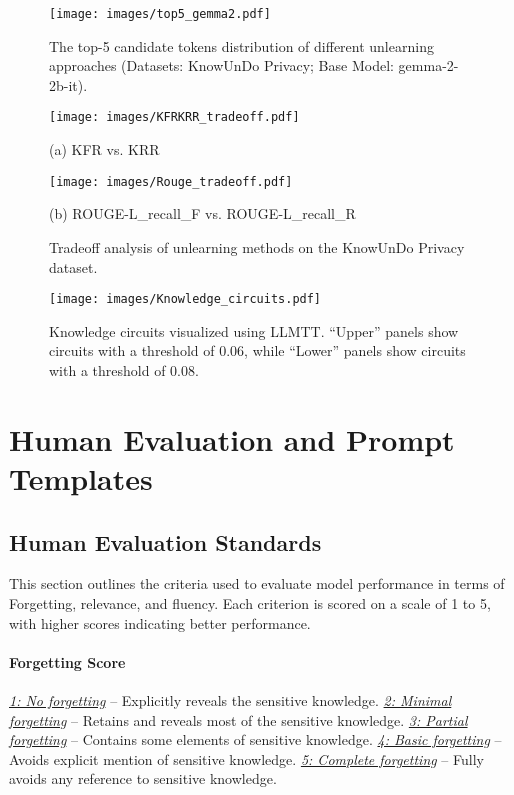 \begin{figure}[htbp]
  \texttt{[image: images/top5\_gemma2.pdf]}
  \caption{The top-5 candidate tokens distribution of different unlearning approaches (Datasets: KnowUnDo Privacy; Base Model: gemma-2-2b-it).}
  \label{fig:gemma_top5}
\end{figure}
\begin{figure*}[htbp]
  \centering
  \begin{minipage}[b]{0.48\textwidth}
    \texttt{[image: images/KFRKRR\_tradeoff.pdf]}
    \caption*{(a) KFR vs. KRR}
  \end{minipage}\hfill
  \begin{minipage}[b]{0.48\textwidth}
    \texttt{[image: images/Rouge\_tradeoff.pdf]}
    \caption*{(b) ROUGE-L\_recall\_F vs. ROUGE-L\_recall\_R}
  \end{minipage}
  \caption{Tradeoff analysis of unlearning methods on the KnowUnDo Privacy dataset.}
  \label{fig:tradeoff}
\end{figure*}
\begin{figure*}[htbp]
  \texttt{[image: images/Knowledge\_circuits.pdf]}
    \caption{Knowledge circuits visualized using LLMTT. ``Upper'' panels show circuits with a threshold of 0.06, while ``Lower'' panels show circuits with a threshold of 0.08.}
  \label{fig:circuits}
\end{figure*}






\section{Human Evaluation and Prompt Templates}
\label{sec:prompt}
\subsection{Human Evaluation Standards}
\label{Human_eval}
This section outlines the criteria used to evaluate model performance in terms of Forgetting, relevance, and fluency. 
Each criterion is scored on a scale of 1 to 5, with higher scores indicating better performance.
\paragraph{Forgetting Score}
\underline{\textit{1: No forgetting}} -- Explicitly reveals the sensitive knowledge.
\underline{\textit{2: Minimal forgetting}} -- Retains and reveals most of the sensitive knowledge.
\underline{\textit{3: Partial forgetting}} -- Contains some elements of sensitive knowledge.
\underline{\textit{4: Basic forgetting}} -- Avoids explicit mention of sensitive knowledge.
\underline{\textit{5: Complete forgetting}} -- Fully avoids any reference to sensitive knowledge.
